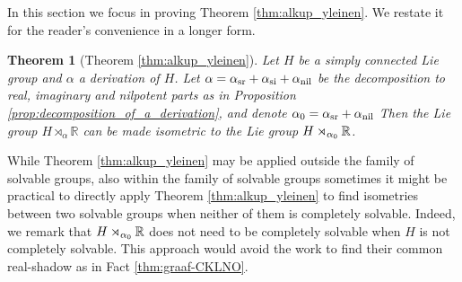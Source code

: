 \documentclass[a4paper,12pt]{amsart}
\theoremstyle{plain}
\theoremstyle{definition}
\theoremstyle{plain}
\newtheorem*{lausei}{Theorem}
\theoremstyle{remark}
\newtheorem{huom}[maar]{Remark}
\begin{document}
\label{sec:semidirect}

In this section we focus in proving Theorem \ref{thm:alkup_yleinen}. We restate it for the reader's convenience in a longer form.

\begin{lausei}[Theorem \ref{thm:alkup_yleinen}] %
	Let \( H \) be a simply connected Lie group and \( \alpha \) a derivation of \( H\). Let \( \alpha = \alpha_\mathrm{sr} + \alpha_\mathrm{si} + \alpha_\mathrm{nil} \) be the decomposition to real, imaginary and nilpotent parts as in Proposition \ref{prop:decomposition_of_a_derivation}, and denote \( {\alpha_0}=\alpha_\mathrm{sr} + \alpha_\mathrm{nil} \)
	Then the Lie group \(  H \rtimes_\alpha \mathbb{R} \) can be made isometric to the Lie group \(  H \rtimes_{{\alpha_0}} \mathbb{R} \).
\end{lausei}


While Theorem \ref{thm:alkup_yleinen} may be applied outside the family of solvable groups, also within the family of solvable groups sometimes it might be practical to directly apply Theorem \ref{thm:alkup_yleinen} to find isometries between two solvable groups when neither of them is completely solvable.  Indeed, we remark that \(  H \rtimes_{{\alpha_0}} \mathbb{R} \) does not need to be completely solvable when \( H \) is not completely solvable. This approach would avoid the work to find their common real-shadow as in Fact \ref{thm:graaf-CKLNO}.
\end{document}
